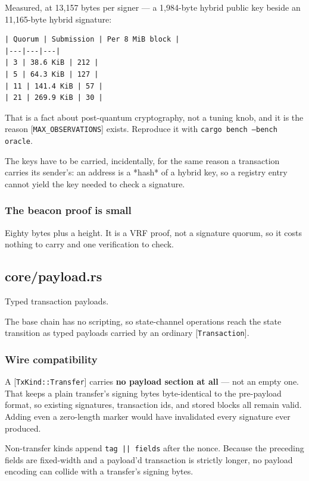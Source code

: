 \documentclass[11pt,a4paper]{article}
\begin{document}
Measured, at 13,157 bytes per signer — a 1,984-byte hybrid public key beside
an 11,165-byte hybrid signature:

\begin{verbatim}
| Quorum | Submission | Per 8 MiB block |
|---|---|---|
| 3 | 38.6 KiB | 212 |
| 5 | 64.3 KiB | 127 |
| 11 | 141.4 KiB | 57 |
| 21 | 269.9 KiB | 30 |
\end{verbatim}

That is a fact about post-quantum cryptography, not a tuning knob, and it is
the reason [\texttt{MAX\_OBSERVATIONS}] exists. Reproduce it with
\texttt{cargo bench --bench oracle}.

The keys have to be carried, incidentally, for the same reason a transaction
carries its sender's: an address is a *hash* of a hybrid key, so a registry
entry cannot yield the key needed to check a signature.

\subsubsection{The beacon proof is small}

Eighty bytes plus a height. It is a VRF proof, not a signature quorum, so it
costs nothing to carry and one verification to check.

\subsection{core/payload.rs}
Typed transaction payloads.

The base chain has no scripting, so state-channel operations reach the state
transition as typed payloads carried by an ordinary [\texttt{Transaction}].

\subsubsection{Wire compatibility}

A [\texttt{TxKind::Transfer}] carries \textbf{no payload section at all} — not an empty
one. That keeps a plain transfer's signing bytes byte-identical to the
pre-payload format, so existing signatures, transaction ids, and stored
blocks all remain valid. Adding even a zero-length marker would have
invalidated every signature ever produced.

Non-transfer kinds append \texttt{tag || fields} after the nonce. Because the
preceding fields are fixed-width and a payload'd transaction is strictly
longer, no payload encoding can collide with a transfer's signing bytes.
\end{document}
